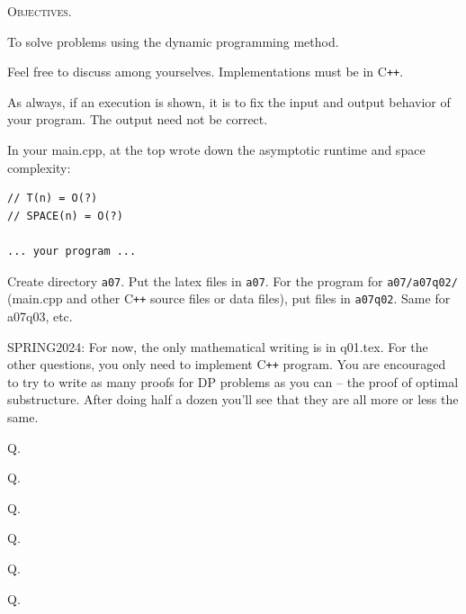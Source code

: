 


\renewcommand\TITLE{Assignment 7}

\newcommand\nextq{
  \newpage
  \addtocounter{qc}{1}
  Q{\theqc}.
  }



\topmatter

\textsc{Objectives.}

\begin{enumerate}
  \li To solve problems using the dynamic programming method.
\end{enumerate}

Feel free to discuss among yourselves.
Implementations must be in C\texttt{++}.

As always, if an execution is shown, it is to fix the input and output
behavior of your program.
The output need not be correct.

In your main.cpp, at the top wrote down the asymptotic runtime
and space complexity:
\begin{Verbatim}[frame=single,fontsize=\small]
// T(n) = O(?)
// SPACE(n) = O(?)

... your program ...
\end{Verbatim}

Create directory \verb!a07!.
Put the latex files in \verb!a07!.
For the program for \verb!a07/a07q02/!
(main.cpp and other C\texttt{++} source files or data
files), put files in \verb!a07q02!.
Same for a07q03, etc.

SPRING2024:
For now, the only mathematical writing is in q01.tex.
For the other questions, you only need to implement C\texttt{++} program.
You are encouraged to try to write as many proofs for DP problems as you
can -- the proof of optimal substructure. After doing half a dozen you'll see
that they are all more or less the same.

\nextq


\SOLUTION


\nextq


\nextq


\nextq


\nextq


\nextq



